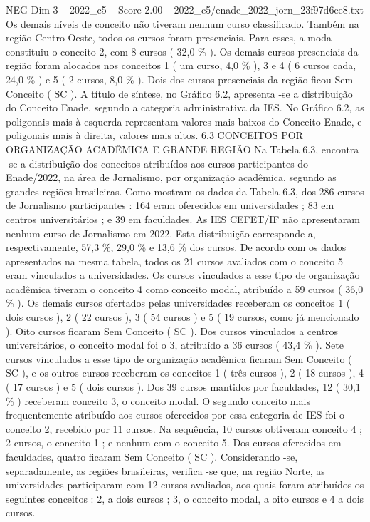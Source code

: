 \begin{textsample}{NEG Dim 3 – 2022\_c5 – Score 2.00 – 2022\_c5/enade\_2022\_jorn\_23f97d6ee8.txt}
Os demais níveis de conceito não tiveram nenhum curso classificado.
Também na região Centro-Oeste, todos os cursos foram presenciais.
Para esses, a moda constituiu o conceito 2, com 8 cursos ( 32,0 \% ).
Os demais cursos presenciais da região foram alocados nos conceitos 1 ( um curso, 4,0 \% ), 3 e 4 ( 6 cursos cada, 24,0 \% ) e 5 ( 2 cursos, 8,0 \% ).
Dois dos cursos presenciais da região ficou Sem Conceito ( SC ).
A título de síntese, no Gráfico 6.2, apresenta -se a distribuição do Conceito Enade, segundo a categoria administrativa da IES.
No Gráfico 6.2, as poligonais mais à esquerda representam valores mais baixos do Conceito Enade, e poligonais mais à direita, valores mais altos. 6.3 CONCEITOS POR ORGANIZAÇÃO ACADÊMICA E GRANDE REGIÃO Na Tabela 6.3, encontra -se a distribuição dos conceitos atribuídos aos cursos participantes do Enade/2022, na área de Jornalismo, por organização acadêmica, segundo as grandes regiões brasileiras.
Como mostram os dados da Tabela 6.3, dos 286 cursos de Jornalismo participantes : 164 eram oferecidos em universidades ; 83 em centros universitários ; e 39 em faculdades.
As IES CEFET/IF não apresentaram nenhum curso de Jornalismo em 2022.
Esta distribuição corresponde a, respectivamente, 57,3 \%, 29,0 \% e 13,6 \% dos cursos.
De acordo com os dados apresentados na mesma tabela, todos os 21 cursos avaliados com o conceito 5 eram vinculados a universidades.
Os cursos vinculados a esse tipo de organização acadêmica tiveram o conceito 4 como conceito modal, atribuído a 59 cursos ( 36,0 \% ).
Os demais cursos ofertados pelas universidades receberam os conceitos 1 ( dois cursos ), 2 ( 22 cursos ), 3 ( 54 cursos ) e 5 ( 19 cursos, como já mencionado ).
Oito cursos ficaram Sem Conceito ( SC ).
Dos cursos vinculados a centros universitários, o conceito modal foi o 3, atribuído a 36 cursos ( 43,4 \% ).
Sete cursos vinculados a esse tipo de organização acadêmica ficaram Sem Conceito ( SC ), e os outros cursos receberam os conceitos 1 ( três cursos ), 2 ( 18 cursos ), 4 ( 17 cursos ) e 5 ( dois cursos ).
Dos 39 cursos mantidos por faculdades, 12 ( 30,1 \% ) receberam conceito 3, o conceito modal.
O segundo conceito mais frequentemente atribuído aos cursos oferecidos por essa categoria de IES foi o conceito 2, recebido por 11 cursos.
Na sequência, 10 cursos obtiveram conceito 4 ; 2 cursos, o conceito 1 ; e nenhum com o conceito 5.
Dos cursos oferecidos em faculdades, quatro ficaram Sem Conceito ( SC ).
Considerando -se, separadamente, as regiões brasileiras, verifica -se que, na região Norte, as universidades participaram com 12 cursos avaliados, aos quais foram atribuídos os seguintes conceitos : 2, a dois cursos ; 3, o conceito modal, a oito cursos e 4 a dois cursos.

\end{textsample}
